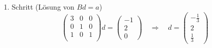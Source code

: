 \documentclass[a4paper]{scrartcl}
\begin{document}
\begin{enumerate}[label=\bfseries\arabic*.]
\begin{enumerate}
\begin{enumerate}[1.]
\begin{enumerate}[1.]
                            \item Schritt (Lösung von $Bd = a$)
                                \begin{equation}
                                    \begin{pmatrix}
                                        3 & 0 & 0 \\
                                        0 & 1 & 0 \\
                                        1 & 0 & 1 \\
                                    \end{pmatrix}
                                    d
                                    =
                                    \begin{pmatrix}
                                        -1 \\ 2 \\ 0
                                    \end{pmatrix}
                                    \quad\Rightarrow\quad
                                    d =
                                    \begin{pmatrix}
                                        -\frac{1}{3} \\ 2 \\ \frac{1}{3}
                                    \end{pmatrix}
                                \end{equation}


\end{enumerate}
\end{enumerate}
\end{enumerate}
\end{enumerate}
\end{document}
